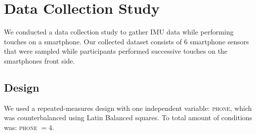 \section{Data Collection Study}
We conducted a data collection study to gather IMU data while performing touches on a smartphone.
Our collected dataset consists of 6 smartphone sensors that were sampled while participants performed successive touches on the smartphones front side. 
\subsection{Design}
We used a repeated-measures design with one independent variable: \textsc{phone}, which was counterbalanced using Latin Balanced squares. To total amount of conditions was: \textsc{phone} $ = 4$.
